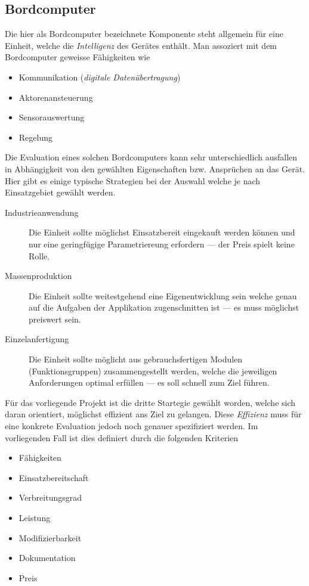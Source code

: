 \subsection{Bordcomputer}
\label{bordcomputer}
Die hier als Bordcomputer bezeichnete Komponente steht allgemein für eine
Einheit, welche die \emph{Intelligenz} des Gerätes enthält. Man assoziert
mit dem Bordcomputer geweisse Fähigkeiten wie
\begin{itemize}
	\item Kommunikation (\emph{digitale Datenübertragung})
	\item Aktorenansteuerung
	\item Sensorauswertung
	\item Regelung
\end{itemize}

Die Evaluation eines solchen Bordcomputers kann sehr unterschiedlich 
ausfallen in Abhängigkeit von den gewählten Eigenschaften bzw. 
Ansprüchen an das Gerät. Hier gibt es einige typische Strategien bei der
Auswahl welche je nach Einsatzgebiet gewählt werden.
\begin{description}
	\item[Industrieanwendung] Die Einheit sollte möglichst 
		Einsatzbereit eingekauft werden können und nur eine 
		geringfügige Parametriereung erfordern --- der Preis 
		spielt keine Rolle.
	\item[Massenproduktion] Die Einheit sollte weitestgehend eine
		Eigenentwicklung sein welche genau auf die Aufgaben
		der Applikation zugenschnitten ist --- es muss möglichst
		preiswert sein.
	\item[Einzelanfertigung] Die Einheit sollte möglicht aus 
		gebrauchsfertigen Modulen (Funktionsgruppen) 
		zusammengestellt werden, welche die jeweiligen 
		Anforderungen optimal erfüllen --- es soll schnell zum
		Ziel führen.
\end{description}

Für das vorliegende Projekt ist die dritte Startegie gewählt worden, 
welche sich daran orientiert, möglichst effizient ans Ziel zu gelangen.
Diese \emph{Effizienz} muss für eine konkrete Evaluation jedoch noch
genauer spezifiziert werden. Im vorliegenden Fall ist dies definiert
durch die folgenden Kriterien

\begin{itemize}
	\item Fähigkeiten
	\item Einsatzbereitschaft
	\item Verbreitungsgrad
	\item Leistung
	\item Modifizierbarkeit
	\item Dokumentation
	\item Preis
\end{itemize}

